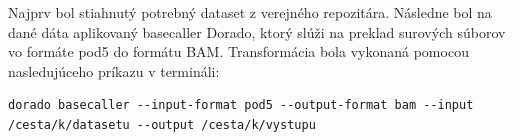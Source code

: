 Najprv bol stiahnutý potrebný dataset z verejného repozitára. %
Následne bol na dané dáta aplikovaný basecaller Dorado, ktorý slúži na preklad surových súborov vo formáte pod5 do formátu BAM.
Transformácia bola vykonaná pomocou nasledujúceho príkazu v termináli:
\begin{verbatim}
dorado basecaller --input-format pod5 --output-format bam --input /cesta/k/datasetu --output /cesta/k/vystupu
\end{verbatim}

